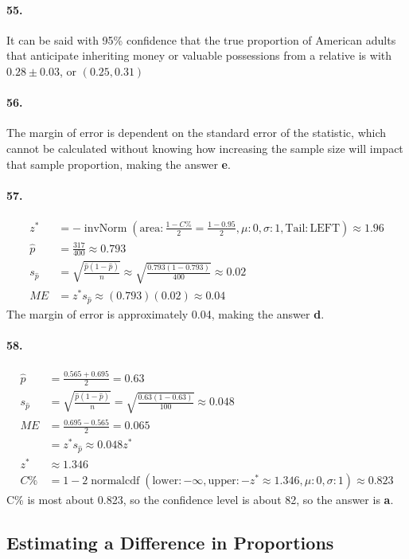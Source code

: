 \documentclass[12pt, A4]{article}
\DeclareMathOperator{\invNorm}{invNorm}
\DeclareMathOperator{\normalcdf}{normalcdf}
\newcommand{\invNormal}[4]{\invNorm\left(\mathrm{area}:#1, \mu: #2, \sigma: #3, \mathrm{Tail: #4}\right)}
\newcommand{\normalCDF}[4]{\normalcdf\left(\mathrm{lower}: #1, \mathrm{upper}: #2, \mu: #3, \sigma: #4\right)}
\newcommand{\propse}[2]{\sqrt{\frac{#1\left(1 - #1\right)}{#2}}}
\begin{document}
		\paragraph{55.}
			It can be said with 95\% confidence that the true proportion of American adults that anticipate inheriting money or valuable possessions from a relative is with $0.28 \pm 0.03$, or $(0.25, 0.31)$
		\paragraph{56.}
			The margin of error is dependent on the standard error of the statistic, which cannot be calculated without knowing how increasing the sample size will impact that sample proportion, making the answer \textbf{e}.
		\paragraph{57.}
			\begin{align*}
				z^* &= -\invNormal{\frac{1 - C\%}{2} = \frac{1 - 0.95}{2}}{0}{1}{LEFT} \approx 1.96 \\
				\hat{p} &= \frac{317}{400} \approx 0.793 \\
				s_{\hat{p}} &= \propse{\hat{p}}{n} \approx \propse{0.793}{400} \approx 0.02  \\
				ME &= z^*s_{\hat{p}} \approx (0.793)(0.02) \approx 0.04
			\end{align*}
			The margin of error is approximately 0.04, making the answer \textbf{d}.
		\paragraph{58.}
			\begin{align*}
				\hat{p} &= \frac{0.565 + 0.695}{2} = 0.63 \\
				s_{\hat{p}} &= \sqrt{\frac{\hat{p}(1 - \hat{p})}{n}} = \sqrt{\frac{0.63(1 - 0.63)}{100}} \approx 0.048 \\
				ME &= \frac{0.695 - 0.565}{2} = 0.065 \\
					&= z^*s_{\hat{p}} \approx 0.048z^* \\ 
				z^* &\approx 1.346 \\
				C\% &= 1 - 2\normalCDF{-\infty}{-z^* \approx 1.346}{0}{1} \approx 0.823
			\end{align*}
			C\% is most about 0.823, so the confidence level is about 82, so the answer is \textbf{a}.
	\subsection{Estimating a Difference in Proportions}
\end{document}
